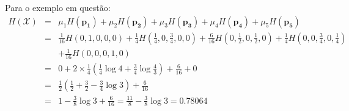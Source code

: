 \begin{frame}[allowframebreaks]
\framebreak

Para o exemplo em questão:
\begin{eqnarray}
  H(\mathcal{X}) &=& \mu_1 H(\mathbf{p_1}) + \mu_2 H(\mathbf{p_2}) + \mu_3 H(\mathbf{p_3}) +
        \mu_4 H(\mathbf{p_4}) + \mu_5 H(\mathbf{p_5}) \nonumber \\
        &=& \frac{1}{16} H(0,1,0,0,0) + \frac{1}{4} H(\frac{1}{4}, 0, \frac{3}{4}, 0, 0) + 
                \frac{6}{16} H(0, \frac{1}{2}, 0, \frac{1}{2}, 0) + 
                \frac{1}{4} H(0, 0, \frac{3}{4}, 0, \frac{1}{4}) \nonumber \\
            && + \frac{1}{16} H(0, 0, 0, 1, 0) \nonumber \\
        &=& 0 + 2 \times \frac{1}{4} \left( \frac{1}{4} \log 4 + \frac{3}{4} \log \frac{4}{3} \right) +
                \frac{6}{16} + 0 \nonumber \\
        &=& \frac{1}{2} \left( \frac{1}{2} + \frac{3}{2} - \frac{3}{4} \log 3  \right) + \frac{6}{16} \nonumber \\
        &=& 1 - \frac{3}{8} \log 3 + \frac{6}{16} = \frac{11}{8} - \frac{3}{8} \log 3 = 0.78064
\end{eqnarray}


\end{frame}

